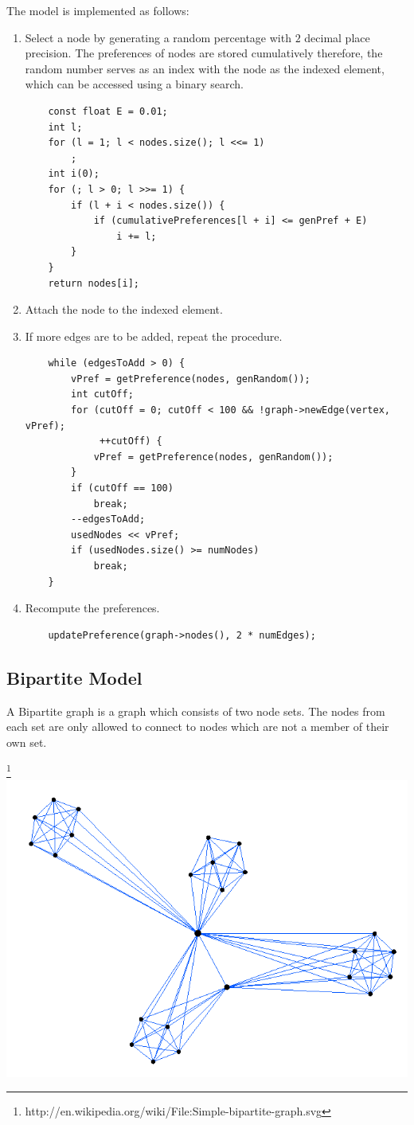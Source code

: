 \documentclass[a4paper,11pt,titlepage]{article}
\begin{document}
The model is implemented as follows:
\begin{enumerate}
\item Select a node by generating a random percentage with $2$ decimal place
precision.
The preferences of nodes are stored cumulatively therefore, the random number
serves as an index with the node as the indexed element, which can be accessed
using a binary search.
\begin{lstlisting}
    const float E = 0.01;
    int l;
    for (l = 1; l < nodes.size(); l <<= 1)
        ;
    int i(0);
    for (; l > 0; l >>= 1) {
        if (l + i < nodes.size()) {
            if (cumulativePreferences[l + i] <= genPref + E)
                i += l;
        }
    }
    return nodes[i];
\end{lstlisting}
  \item Attach the node to the indexed element.
  \item If more edges are to be added, repeat the procedure.
\begin{lstlisting}
    while (edgesToAdd > 0) {
        vPref = getPreference(nodes, genRandom());
        int cutOff;
        for (cutOff = 0; cutOff < 100 && !graph->newEdge(vertex, vPref);
             ++cutOff) {
            vPref = getPreference(nodes, genRandom());
        }
        if (cutOff == 100)
            break;
        --edgesToAdd;
        usedNodes << vPref;
        if (usedNodes.size() >= numNodes)
            break;
    }
\end{lstlisting}
  \item Recompute the preferences.
\begin{lstlisting}
    updatePreference(graph->nodes(), 2 * numEdges);
\end{lstlisting}
\end{enumerate}

\subsection{Bipartite Model}

A Bipartite graph is a graph which consists of two node sets. The nodes from
each set are only allowed to connect to nodes which are not a member of their
own set.

\footnote{http://en.wikipedia.org/wiki/File:Simple-bipartite-graph.svg}\includegraphics[scale=0.3]{bipartite}
\end{document}
